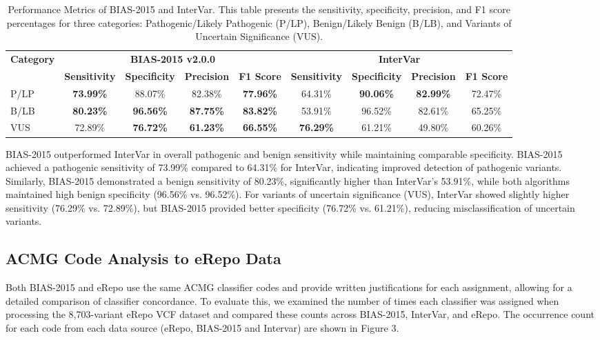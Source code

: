 \documentclass[unnumsec,webpdf,contemporary,large]{oup-authoring-template}
\theoremstyle{thmstyleone}
\theoremstyle{thmstyletwo}
\theoremstyle{thmstylethree}
\begin{document}
\begin{table*}[!ht]
\caption{Performance Metrics of BIAS-2015 and InterVar. This table presents the sensitivity, specificity, precision, and F1 score percentages for three categories: Pathogenic/Likely Pathogenic (P/LP), Benign/Likely Benign (B/LB), and Variants of Uncertain Significance (VUS).}
\label{tab:sensitivity_specificity}
\centering
\begin{minipage}{\textwidth}
\small
\tabcolsep=5pt
\begin{tabular*}{\textwidth}{@{\extracolsep{\fill}}lcccccccc@{}}
\toprule
\multirow{2}{*}{\textbf{Category}} & \multicolumn{4}{c}{\textbf{BIAS-2015 v2.0.0}} & \multicolumn{4}{c}{\textbf{InterVar}} \\
\cmidrule(lr){2-5} \cmidrule(lr){6-9}
 & \textbf{Sensitivity} & \textbf{Specificity} & \textbf{Precision} & \textbf{F1 Score} & \textbf{Sensitivity} & \textbf{Specificity} & \textbf{Precision} & \textbf{F1 Score} \\
\midrule
P/LP & \textbf{73.99\%} & 88.07\% & 82.38\% & \textbf{77.96\%} & 64.31\% & \textbf{90.06\%} & \textbf{82.99\%} & 72.47\% \\
B/LB & \textbf{80.23\%} & \textbf{96.56\%} & \textbf{87.75\%} & \textbf{83.82\%} & 53.91\% & 96.52\% & 82.61\% & 65.25\% \\
VUS & 72.89\% & \textbf{76.72\%} & \textbf{61.23\%} & \textbf{66.55\%} & \textbf{76.29\%} & 61.21\% & 49.80\% & 60.26\% \\
\bottomrule
\end{tabular*}
\end{minipage}
\end{table*}

BIAS-2015 outperformed InterVar in overall pathogenic and benign sensitivity while maintaining comparable specificity. BIAS-2015 achieved a pathogenic sensitivity of 73.99\% compared to 64.31\% for InterVar, indicating improved detection of pathogenic variants. Similarly, BIAS-2015 demonstrated a benign sensitivity of 80.23\%, significantly higher than InterVar’s 53.91\%, while both algorithms maintained high benign specificity (96.56\% vs. 96.52\%). For variants of uncertain significance (VUS), InterVar showed slightly higher sensitivity (76.29\% vs. 72.89\%), but BIAS-2015 provided better specificity (76.72\% vs. 61.21\%), reducing misclassification of uncertain variants.

\subsection{ACMG Code Analysis to eRepo Data}
Both BIAS-2015 and eRepo use the same ACMG classifier codes and provide written justifications for each assignment, allowing for a detailed comparison of classifier concordance. To evaluate this, we examined the number of times each classifier was assigned when processing the 8,703-variant eRepo VCF dataset and compared these counts across BIAS-2015, InterVar, and eRepo. The occurrence count for each code from each data source (eRepo, BIAS-2015 and Intervar) are shown in Figure 3. 
\end{document}
